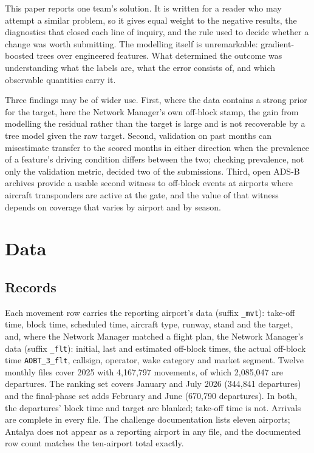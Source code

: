 \documentclass[
  manuscript=article,
  layout=preprint,
  year=2027,
  volume=x,
]{extra/joas}
\begin{document}
This paper reports one team's solution. It is written for a reader who may attempt a similar problem, so it gives equal weight to the negative results, the diagnostics that closed each line of inquiry, and the rule used to decide whether a change was worth submitting. The modelling itself is unremarkable: gradient-boosted trees over engineered features. What determined the outcome was understanding what the labels are, what the error consists of, and which observable quantities carry it.

Three findings may be of wider use. First, where the data contains a strong prior for the target, here the Network Manager's own off-block stamp, the gain from modelling the residual rather than the target is large and is not recoverable by a tree model given the raw target. Second, validation on past months can misestimate transfer to the scored months in either direction when the prevalence of a feature's driving condition differs between the two; checking prevalence, not only the validation metric, decided two of the submissions. Third, open ADS-B archives provide a usable second witness to off-block events at airports where aircraft transponders are active at the gate, and the value of that witness depends on coverage that varies by airport and by season.

\section{Data}

\subsection{Records}

Each movement row carries the reporting airport's data (suffix \texttt{\_mvt}): take-off time, block time, scheduled time, aircraft type, runway, stand and the target, and, where the Network Manager matched a flight plan, the Network Manager's data (suffix \texttt{\_flt}): initial, last and estimated off-block times, the actual off-block time \texttt{AOBT\_3\_flt}, callsign, operator, wake category and market segment. Twelve monthly files cover 2025 with 4,167,797 movements, of which 2,085,047 are departures. The ranking set covers January and July 2026 (344,841 departures) and the final-phase set adds February and June (670,790 departures). In both, the departures' block time and target are blanked; take-off time is not. Arrivals are complete in every file. The challenge documentation lists eleven airports; Antalya does not appear as a reporting airport in any file, and the documented row count matches the ten-airport total exactly.
\end{document}
